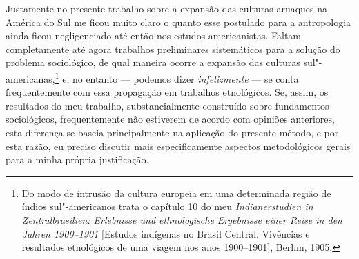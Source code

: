 {Justamente no presente trabalho sobre a expansão das culturas aruaques na
América do Sul me ficou muito claro o quanto esse postulado para a
antropologia ainda ficou negligenciado até então nos estudos
americanistas. Faltam completamente até agora trabalhos preliminares
sistemáticos para a solução do problema sociológico, de qual maneira
ocorre a expansão das culturas sul"-americanas,\footnote{Do modo de
  intrusão da cultura europeia em uma determinada região de índios
  sul"-americanos trata o capítulo 10 do meu \textit{Indianerstudien in
  Zentralbrasilien: Erlebnisse und ethnologische Ergebnisse einer Reise
  in den Jahren 1900--1901} {[}Estudos indígenas no Brasil Central.
  Vivências e resultados etnológicos de uma viagem nos anos
  1900--1901{]}, Berlim, 1905.} e, no entanto --- podemos dizer
\textit{infelizmente} --- se conta frequentemente com essa propagação em
trabalhos etnológicos. Se, assim, os resultados do meu trabalho,
substancialmente construído sobre fundamentos sociológicos,
frequentemente não estiverem de acordo com opiniões anteriores, esta
diferença se baseia principalmente na aplicação do presente método, e
por esta razão, eu preciso discutir mais especificamente aspectos
metodológicos gerais para a minha própria justificação.}


